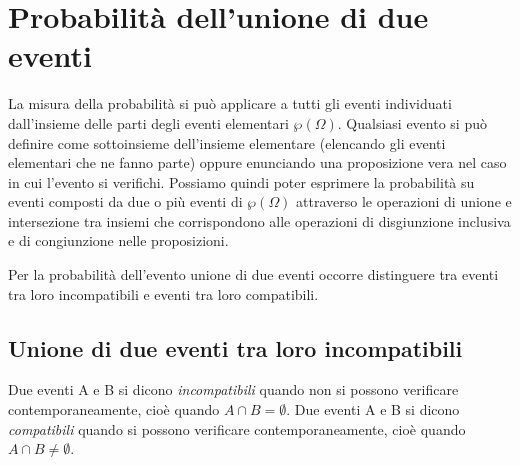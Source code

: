 \vspazio{}

\section{Probabilità dell'unione di due eventi}
La misura della probabilità si può applicare a tutti gli eventi individuati dall'insieme delle parti degli eventi elementari $\wp (\Omega )$. Qualsiasi evento si può definire come sottoinsieme dell'insieme elementare (elencando gli eventi elementari che ne fanno parte) oppure enunciando una proposizione vera nel caso in cui l'evento si verifichi. Possiamo quindi poter esprimere la probabilità su eventi composti da due o più eventi di $\wp (\Omega )$ attraverso le operazioni di unione e intersezione tra insiemi che corrispondono alle operazioni di disgiunzione inclusiva e di congiunzione nelle proposizioni.

Per la probabilità dell'evento unione di due eventi occorre distinguere tra eventi tra loro incompatibili e eventi tra loro compatibili.

\subsection[Unione di due eventi tra loro incompatibili]{Unione di due eventi tra loro incompatibili}

\begin{definizione}
Due eventi A e B si dicono \emph{incompatibili} quando non si possono verificare contemporaneamente, cioè quando $A\cap B=\emptyset $.
Due eventi A e B si dicono \emph{compatibili} quando si possono verificare contemporaneamente, cioè quando $A\cap B\neq \emptyset $.
\end{definizione}

